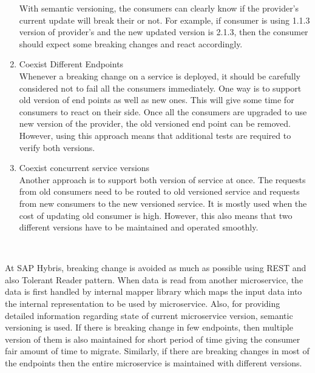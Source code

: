 \begin{enumerate}
With semantic versioning, the consumers can clearly know if the provider's current update will break their  or not. For example, if consumer is using 1.1.3 version of provider's  and the new updated version is 2.1.3, then the consumer should expect some breaking changes and react accordingly.
\item Coexist Different Endpoints \\ Whenever a breaking change on a service is deployed, it should be carefully considered not to fail all the consumers immediately. One way is to support old version of end points as well as new ones. This will give some time for consumers to react on their side. Once all the consumers are upgraded to use new version of the provider, the old versioned end point can be removed. However, using this approach means that additional tests are required to verify both versions.
\item Coexist concurrent service versions \\ Another approach is to support both version of service at once. The requests from old consumers need to be routed to old versioned service and requests from new consumers to the new versioned service. It is mostly used when the cost of updating old consumer is high. However, this also means that two different versions have to be maintained and operated smoothly.
\end{enumerate}
\\
\begin{shaded}
At SAP Hybris, breaking change is avoided as much as possible using \acrshort{REST} and also Tolerant Reader pattern. When data is read from another microservice, the data is first handled by internal mapper library which maps the input data into the internal representation to be used by microservice. Also, for providing detailed information regarding state of current microservice version, semantic versioning is used. If there is breaking change in few endpoints, then multiple version of them is also maintained for short period of time giving the consumer fair amount of time to migrate. Similarly, if there are breaking changes in most of the endpoints then the entire microservice is maintained with different versions.
\end{shaded}
